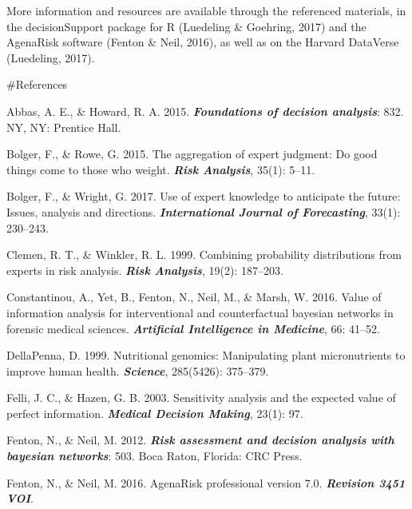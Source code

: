 \documentclass[
]{article}
\newlength{\cslhangindent}
\newlength{\cslentryspacingunit} %
\newenvironment{CSLReferences}[2] %
 {%
  \setlength{\parindent}{0pt}
  \ifodd #1
  \let\oldpar\par
  \def\par{\hangindent=\cslhangindent\oldpar}
  \fi
  \setlength{\parskip}{#2\cslentryspacingunit}
 }%
 {}
\begin{document}
More information and resources are available through the referenced
materials, in the decisionSupport package for R (Luedeling \& Goehring,
2017) and the AgenaRisk software (Fenton \& Neil, 2016), as well as on
the Harvard DataVerse (Luedeling, 2017).

\#References

\hypertarget{refs}{}
\begin{CSLReferences}{1}{0}
\leavevmode{}%
Abbas, A. E., \& Howard, R. A. 2015. \textbf{\emph{Foundations of
decision analysis}}: 832. NY, NY: Prentice Hall.

\leavevmode{}%
Bolger, F., \& Rowe, G. 2015. The aggregation of expert judgment: Do
good things come to those who weight. \textbf{\emph{Risk Analysis}},
35(1): 5--11.

\leavevmode{}%
Bolger, F., \& Wright, G. 2017. Use of expert knowledge to anticipate
the future: Issues, analysis and directions. \textbf{\emph{International
Journal of Forecasting}}, 33(1): 230--243.

\leavevmode{}%
Clemen, R. T., \& Winkler, R. L. 1999. Combining probability
distributions from experts in risk analysis. \textbf{\emph{Risk
Analysis}}, 19(2): 187--203.

\leavevmode{}%
Constantinou, A., Yet, B., Fenton, N., Neil, M., \& Marsh, W. 2016.
Value of information analysis for interventional and counterfactual
bayesian networks in forensic medical sciences. \textbf{\emph{Artificial
Intelligence in Medicine}}, 66: 41--52.

\leavevmode{}%
DellaPenna, D. 1999. Nutritional genomics: Manipulating plant
micronutrients to improve human health. \textbf{\emph{Science}},
285(5426): 375--379.

\leavevmode{}%
Felli, J. C., \& Hazen, G. B. 2003. Sensitivity analysis and the
expected value of perfect information. \textbf{\emph{Medical Decision
Making}}, 23(1): 97.

\leavevmode{}%
Fenton, N., \& Neil, M. 2012. \textbf{\emph{Risk assessment and decision
analysis with bayesian networks}}: 503. Boca Raton, Florida: CRC Press.

\leavevmode{}%
Fenton, N., \& Neil, M. 2016. AgenaRisk professional version 7.0.
\textbf{\emph{Revision 3451 VOI}}.


\end{CSLReferences}
\end{document}
